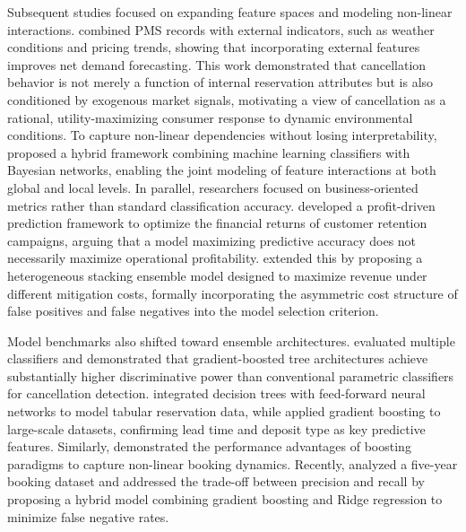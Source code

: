 \documentclass[pdflatex,sn-mathphys-ay]{sn-jnl}
\theoremstyle{thmstyleone}%
\theoremstyle{thmstyletwo}%
\theoremstyle{thmstylethree}%
\begin{document}
Subsequent studies focused on expanding feature spaces and modeling non-linear interactions. \cite{antonio2019big} combined PMS records with external indicators, such as weather conditions and pricing trends, showing that incorporating external features improves net demand forecasting. This work demonstrated that cancellation behavior is not merely a function of internal reservation attributes but is also conditioned by exogenous market signals, motivating a view of cancellation as a rational, utility-maximizing consumer response to dynamic environmental conditions. To capture non-linear dependencies without losing interpretability, \cite{chen2023prediction} proposed a hybrid framework combining machine learning classifiers with Bayesian networks, enabling the joint modeling of feature interactions at both global and local levels. In parallel, researchers focused on business-oriented metrics rather than standard classification accuracy. \cite{liu2023hospitality} developed a profit-driven prediction framework to optimize the financial returns of customer retention campaigns, arguing that a model maximizing predictive accuracy does not necessarily maximize operational profitability. \cite{liu2025explainable} extended this by proposing a heterogeneous stacking ensemble model designed to maximize revenue under different mitigation costs, formally incorporating the asymmetric cost structure of false positives and false negatives into the model selection criterion.

Model benchmarks also shifted toward ensemble architectures. \cite{yoo2024predicting} evaluated multiple classifiers and demonstrated that gradient-boosted tree architectures achieve substantially higher discriminative power than conventional parametric classifiers for cancellation detection. \cite{yang2024predicting} integrated decision trees with feed-forward neural networks to model tabular reservation data, while \cite{luo2025hotel} applied gradient boosting to large-scale datasets, confirming lead time and deposit type as key predictive features. Similarly, \cite{febrian2024hotel} demonstrated the performance advantages of boosting paradigms to capture non-linear booking dynamics. Recently, \cite{ampountolas2025predicting} analyzed a five-year booking dataset and addressed the trade-off between precision and recall by proposing a hybrid model combining gradient boosting and Ridge regression to minimize false negative rates.
\end{document}
